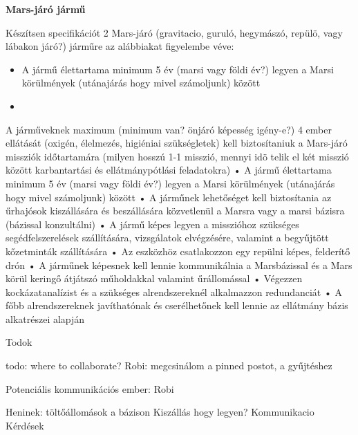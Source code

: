 \documentclass[12pt]{report}
\begin{document}
\textbf{Mars-járó jármű}

Készítsen specifikációt 2 Mars-járó (gravitacio, guruló, hegymászó, repülö, vagy lábakon járó?) járműre az alábbiakat figyelembe véve:

\begin{itemize}
    \item A jármű élettartama minimum 5 év (marsi vagy földi év?) legyen a Marsi körülmények (utánajárás hogy mivel számoljunk) között
    \item 
\end{itemize}

A járműveknek maximum (minimum van? önjáró képesség igény-e?) 4 ember ellátását (oxigén, élelmezés, higiéniai szükségletek) kell biztosítaniuk a Mars-járó missziók időtartamára (milyen hosszú 1-1 misszió, mennyi idö telik el két misszió között karbantartási és ellátmánypótlási feladatokra)
• A jármű élettartama minimum 5 év (marsi vagy földi év?) legyen a Marsi körülmények (utánajárás hogy mivel számoljunk) között
• A járműnek lehetőséget kell biztosítania az űrhajósok kiszállására és beszállására
közvetlenül a Marsra vagy a marsi bázisra (bázissal konzultálni)
• A jármű képes legyen a misszióhoz szükséges segédfelszerelések szállítására, vizsgálatok
elvégzésére, valamint a begyűjtött kőzetminták szállítására
• Az eszközhöz csatlakozzon egy repülni képes, felderítő drón
• A járműnek képesnek kell lennie kommunikálnia a Marsbázissal és a Mars körül keringő
átjátszó műholdakkal valamint űrállomással
• Végezzen kockázatanalízist és a szükséges alrendszereknél alkalmazzon redundanciát
• A főbb alrendszereknek javíthatónak és cserélhetőnek kell lennie az ellátmány bázis
alkatrészei alapján

Todok

todo: where to collaborate? 
Robi: megcsinálom a pinned postot, a gyűjtéshez

Potenciális kommunikációs ember: Robi


Heninek: 
töltőállomások a bázison
Kiszállás hogy legyen?
Kommunikacio
Kérdések
\end{document}
